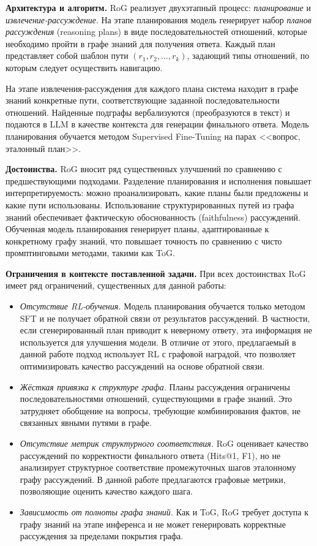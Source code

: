 \textbf{Архитектура и алгоритм.}
RoG реализует двухэтапный процесс: \textit{планирование} и \textit{извлечение-рассуждение}. На этапе планирования модель генерирует набор \textit{планов рассуждения} (reasoning plans) в виде последовательностей отношений, которые необходимо пройти в графе знаний для получения ответа. Каждый план представляет собой шаблон пути $(r_1, r_2, \ldots, r_k)$, задающий типы отношений, по которым следует осуществить навигацию.

На этапе извлечения-рассуждения для каждого плана система находит в графе знаний конкретные пути, соответствующие заданной последовательности отношений. Найденные подграфы вербализуются (преобразуются в текст) и подаются в LLM в качестве контекста для генерации финального ответа. Модель планирования обучается методом Supervised Fine-Tuning на парах <<вопрос, эталонный план>>.

\textbf{Достоинства.}
RoG вносит ряд существенных улучшений по сравнению с предшествующими подходами. Разделение планирования и исполнения повышает интерпретируемость: можно проанализировать, какие планы были предложены и какие пути использованы. Использование структурированных путей из графа знаний обеспечивает фактическую обоснованность (faithfulness) рассуждений. Обученная модель планирования генерирует планы, адаптированные к конкретному графу знаний, что повышает точность по сравнению с чисто промптинговыми методами, такими как ToG.

\textbf{Ограничения в контексте поставленной задачи.}
При всех достоинствах RoG имеет ряд ограничений, существенных для данной работы:
\begin{itemize}
    \item \textit{Отсутствие RL-обучения.} Модель планирования обучается только методом SFT и не получает обратной связи от результатов рассуждений. В частности, если сгенерированный план приводит к неверному ответу, эта информация не используется для улучшения модели. В отличие от этого, предлагаемый в данной работе подход использует RL с графовой наградой, что позволяет оптимизировать качество рассуждений на основе обратной связи.
    \item \textit{Жёсткая привязка к структуре графа.} Планы рассуждения ограничены последовательностями отношений, существующими в графе знаний. Это затрудняет обобщение на вопросы, требующие комбинирования фактов, не связанных явными путями в графе.
    \item \textit{Отсутствие метрик структурного соответствия.} RoG оценивает качество рассуждений по корректности финального ответа (Hits@1, F1), но не анализирует структурное соответствие промежуточных шагов эталонному графу рассуждений. В данной работе предлагаются графовые метрики, позволяющие оценить качество каждого шага.
    \item \textit{Зависимость от полноты графа знаний.} Как и ToG, RoG требует доступа к графу знаний на этапе инференса и не может генерировать корректные рассуждения за пределами покрытия графа.
\end{itemize}

